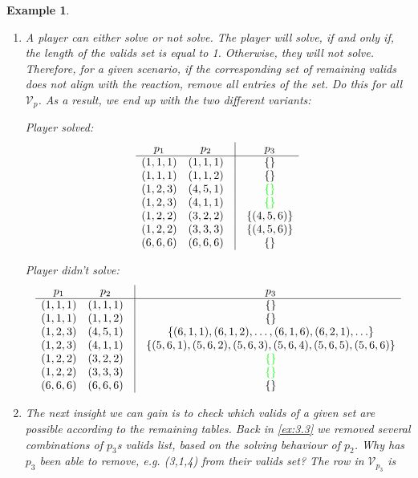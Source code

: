 \documentclass{article}
\newtheorem{example}{Example}[section]
\begin{document}
\begin{example}
\begin{enumerate}
\item A player can either solve or not solve. The player will solve, if and only if, the length of the valids set is equal to 1. Otherwise, they will not solve. Therefore, for a given scenario, if the corresponding set of remaining valids does not align with the reaction, remove all entries of the set. Do this for all $\mathcal{V}_p$. As a result, we end up with the two different variants:

Player solved:
\[
\begin{array}{cccc}
p_1 & p_2 & \vline & p_3 \\ \hline
(1,1,1) & (1,1,1) & \vline & \{ \} \\
(1,1,1) & (1,1,2) & \vline & \{ \} \\
(1,2,3) & (4,5,1) & \vline & \color{green} \{ \} \color{black} \\
(1,2,3) & (4,1,1) & \vline & \color{green} \{ \} \color{black} \\
(1,2,2) & (3,2,2) & \vline & \{ (4,5,6) \} \\
(1,2,2) & (3,3,3) & \vline & \{ (4,5,6) \} \\
(6,6,6) & (6,6,6) & \vline & \{ \}
\end{array} 
\]

Player didn't solve:
\[
\begin{array}{cccc}
p_1 & p_2 & \vline & p_3 \\ \hline
(1,1,1) & (1,1,1) & \vline & \{ \} \\
(1,1,1) & (1,1,2) & \vline & \{ \} \\
(1,2,3) & (4,5,1) & \vline & \{ (6,1,1), (6,1,2), \ldots, (6,1,6), (6,2,1), \ldots \} \\
(1,2,3) & (4,1,1) & \vline & \{ (5,6,1), (5,6,2), (5,6,3), (5,6,4), (5,6,5), (5,6,6) \} \\
(1,2,2) & (3,2,2) & \vline & \color{green} \{ \} \color{black} \\
(1,2,2) & (3,3,3) & \vline & \color{green} \{ \} \color{black} \\
(6,6,6) & (6,6,6) & \vline & \{ \}
\end{array} 
\]

\item The next insight we can gain is to check which valids of a given set are possible according to the remaining tables. Back in \cref{ex:3.3} we removed several combinations of $p_3$s valids list, based on the solving behaviour of $p_2$. Why has $p_3$ been able to remove, e.g. (3,1,4) from their valids set? The row in $\mathcal{V}_{p_3}$ is 


\end{enumerate}
\end{example}
\end{document}
